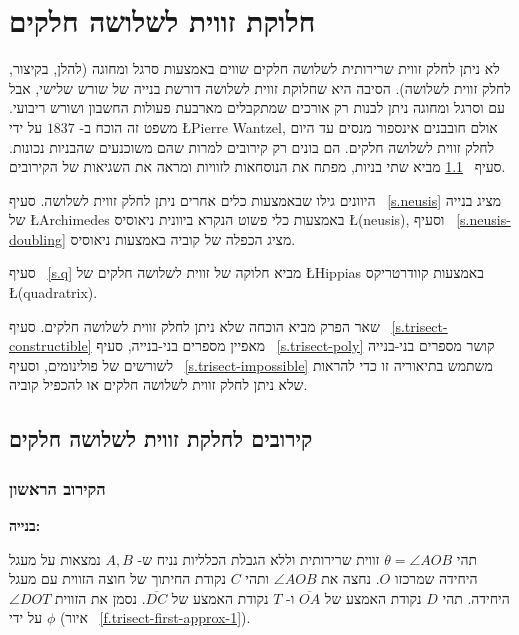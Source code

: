 

\chapter{חלוקת זווית לשלושה חלקים}
\label{c.trisect}

לא ניתן לחלק זווית שרירותית לשלושה חלקים שווים באמצעות סרגל ומחוגה (להלן, בקיצור, לחלק זווית לשלושה). הסיבה היא שחלוקת זווית לשלושה דורשת בנייה של שורש שלישי, אבל עם  וסרגל ומחוגה ניתן לבנות רק אורכים שמתקבלים מארבעת פעולות החשבון ושורש ריבועי. משפט זה הוכח ב-%
$1837$
על ידי
\L{Pierre Wantzel},
אולם חובבנים אינספור מנסים עד היום לחלק זווית לשלושה חלקים. הם בונים רק קירובים למרות שהם משוכנעים שהבניות נכונות. סעיף%
~\ref{s.trisect-approx}
מביא שתי בניות, מפתח את הנוסחאות לזוויות ומראה את השגיאות של הקירובים.

היוונים גילו שבאמצעות כלים אחרים ניתן לחלק זווית לשלושה. סעיף%
~\ref{s.neusis}
מציג בנייה של
\L{Archimedes}
באמצעות כלי פשוט הנקרא ביוונית ניאוסיס
\L{(neusis)},
וסעיף%
~\ref{s.neusis-doubling}
מציג הכפלה של קוביה באמצעות ניאוסיס.

סעיף%
~\ref{s.q}
מביא חלוקה של זווית לשלושה חלקים של
\L{Hippias}
באמצעות קוודרטריקס
\L{(quadratrix)}.

שאר הפרק מביא הוכחה שלא ניתן לחלק זווית לשלושה חלקים. סעיף%
~\ref{s.trisect-constructible}
מאפיין מספרים בני-בנייה, סעיף%
~\ref{s.trisect-poly}
קושר מספרים בני-בנייה לשורשים של פולינומים, וסעיף%
~\ref{s.trisect-impossible}
משתמש בתיאוריה זו כדי להראות שלא ניתן לחלק זווית לשלושה חלקים או להכפיל קוביה.



\section{קירובים לחלקת זווית לשלושה חלקים}\label{s.trisect-approx}

\subsection{הקירוב הראשון}\label{sub.trisect-approx1}

\noindent\textbf{בנייה:}

תהי 
$\theta=\angle AOB$
זווית שרירותית וללא הגבלת הכלליות נניח ש-%
$A,B$
נמצאות על מעגל היחידה שמרכזו 
$O$.
נחצה את 
$\angle AOB$
ותהי 
$C$
נקודת החיתוך של חוצה הזווית עם מעגל היחידה. תהי
$D$
נקודת האמצע של
$\overline{OA}$
ו-%
$T$ 
נקודת האמצע של
$\overline{DC}$.
נסמן את הזווית
$\angle DOT$
על ידי
$\phi$
(איור%
~\ref{f.trisect-first-approx-1}).

